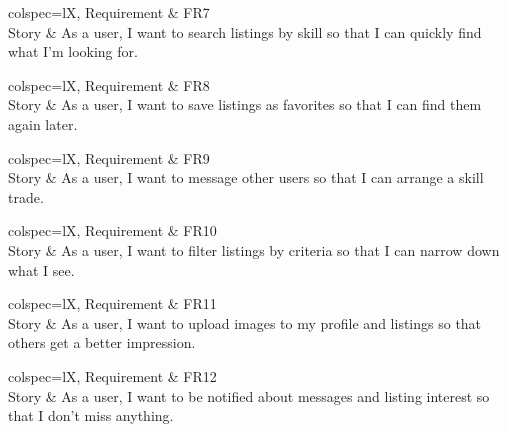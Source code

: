 \begin{htable}[
    caption = {User story 7},
]
    {
        colspec={lX},
    }
        Requirement & FR7 \\
        Story & As a user, I want to search listings by skill so that I can quickly find what I'm looking for. \\
\end{htable}

\begin{htable}[
    caption = {User story 8},
]
    {
        colspec={lX},
    }
        Requirement & FR8 \\
        Story & As a user, I want to save listings as favorites so that I can find them again later. \\
\end{htable}

\begin{htable}[
    caption = {User story 9},
]
    {
        colspec={lX},
    }
        Requirement & FR9 \\
        Story & As a user, I want to message other users so that I can arrange a skill trade. \\
\end{htable}

\begin{htable}[
    caption = {User story 10},
]
    {
        colspec={lX},
    }
        Requirement & FR10 \\
        Story & As a user, I want to filter listings by criteria so that I can narrow down what I see. \\
\end{htable}

\begin{htable}[
    caption = {User story 11},
]
    {
        colspec={lX},
    }
        Requirement & FR11 \\
        Story & As a user, I want to upload images to my profile and listings so that others get a better impression. \\
\end{htable}

\begin{htable}[
    caption = {User story 12},
]
    {
        colspec={lX},
    }
        Requirement & FR12 \\
        Story & As a user, I want to be notified about messages and listing interest so that I don't miss anything. \\
\end{htable}
